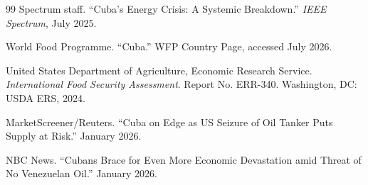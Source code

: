 \documentclass[11pt]{article}
\begin{document}
\begin{thebibliography}{99}
 Spectrum staff. ``Cuba's Energy Crisis: A Systemic Breakdown.'' \textit{IEEE Spectrum}, July 2025.

 World Food Programme. ``Cuba.'' WFP Country Page, accessed July 2026.

 United States Department of Agriculture, Economic Research Service. \textit{International Food Security Assessment}. Report No. ERR-340. Washington, DC: USDA ERS, 2024.

 MarketScreener/Reuters. ``Cuba on Edge as US Seizure of Oil Tanker Puts Supply at Risk.'' January 2026.

 NBC News. ``Cubans Brace for Even More Economic Devastation amid Threat of No Venezuelan Oil.'' January 2026.

\end{thebibliography}
\end{document}
